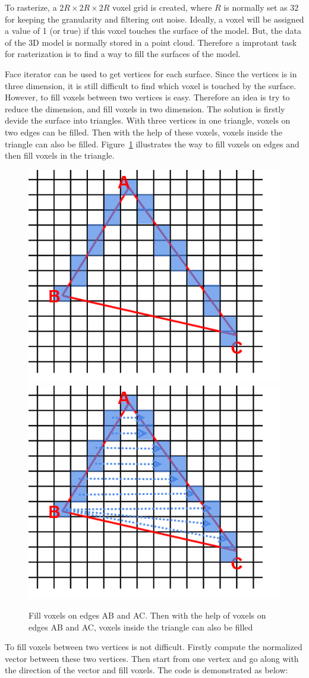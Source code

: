 To rasterize, a $2R\times2R\times2R$ voxel grid is created, where $R$ is normally set as 32 for keeping the granularity and filtering out noise. Ideally, a voxel will be assigned a value of 1 (or true) if this voxel touches the surface of the model. But, the data of the 3D model is normally stored in a point cloud. Therefore a improtant task for rasterization is to find a way to fill the surfaces of the model. 

Face iterator can be used to get vertices for each surface. Since the vertices is in three dimension, it is still difficult to find which voxel is touched by the surface. However, to fill voxels between two vertices is easy. Therefore an idea is try to reduce the dimension, and fill voxels in two dimension. The solution is firstly devide the surface into triangles. With three vertices in one triangle, voxels on two edges can be filled. Then with the help of these voxels, voxels inside the triangle can also be filled. Figure~\ref{rasterization} illustrates the way to fill voxels on edges and then fill voxels in the triangle.

\begin{figure}[h]
\centering
\includegraphics[width=0.4\linewidth]{rasterization_filledges}
\includegraphics[width=0.4\linewidth]{rasterization_fillsurface}
\caption{Fill voxels on edges AB and AC. Then with the help of voxels on edges AB and AC, voxels inside the triangle can also be filled} \label{rasterization}
\end{figure}

To fill voxels between two vertices is not difficult. Firstly compute the normalized vector between these two vertices. Then start from one vertex and go along with the direction of the vector and fill voxels. The code is demonstrated as below:

